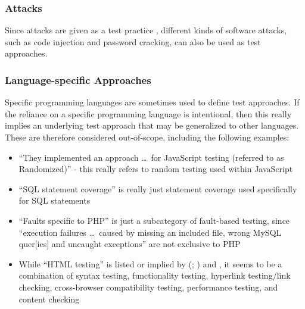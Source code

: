     \subsubsection{Attacks}
    \label{attacks}
    Since attacks are given as a test practice \citep[p.~34]{IEEE2022}, different
    kinds of software attacks, such as code injection and password cracking, can
    also be used as test approaches.

    \subsubsection{Language-specific Approaches}
    \label{lang-test}
    Specific programming languages are sometimes used to define test approaches.
    If the reliance on a specific programming language is intentional, then
    this really implies an underlying test approach that may be generalized to
    other languages. These are therefore considered out-of-scope,
    including the following examples:

    \begin{itemize}
        \item ``They implemented an approach \dots\ for JavaScript testing
              (referred to as Randomized)'' \citep[p.~192]{DoğanEtAl2014} -
              this really refers to random testing used within JavaScript
        \item ``SQL statement coverage'' is really just statement coverage
              used specifically for SQL statements \citep[Tab.~13]{DoğanEtAl2014}
        \item ``Faults specific to PHP'' is just a subcategory of fault-based
              testing, since ``execution failures \dots\ caused by missing an
              included file, wrong MySQL quer[ies] and uncaught exceptions''
              are not exclusive to PHP \citep[Tab.~27]{DoğanEtAl2014}
        \item While ``HTML testing'' is listed or implied by
              \citeauthor{Gerrard2000a} (\citeyear[Tab.~2]{Gerrard2000a};
              \citeyear[Tab.~1, p.~3]{Gerrard2000b}) and
              \citet[p.~220]{Patton2006}, it seems to be a combination of syntax
              testing, functionality testing, hyperlink testing/link checking,
              cross-browser compatibility testing, performance testing, and
              content checking \citep[p.~3]{Gerrard2000b}
    \end{itemize}

